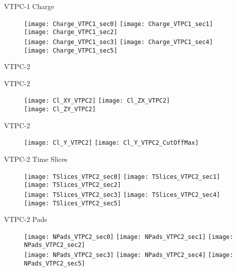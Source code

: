 \documentclass[11pt]{beamer}
\begin{document}
\begin{frame}{VTPC-1 Charge}
\begin{figure}
\centering
\texttt{[image: Charge\_VTPC1\_sec0]}
\texttt{[image: Charge\_VTPC1\_sec1]}
\texttt{[image: Charge\_VTPC1\_sec2]}\\
\texttt{[image: Charge\_VTPC1\_sec3]}
\texttt{[image: Charge\_VTPC1\_sec4]}
\texttt{[image: Charge\_VTPC1\_sec5]}
\end{figure}
\end{frame}

\begin{frame}
\centering
\Huge
VTPC-2
\end{frame}

\begin{frame}{VTPC-2}
\begin{figure}
\centering
\texttt{[image: Cl\_XY\_VTPC2]}
\texttt{[image: Cl\_ZX\_VTPC2]}\\
\texttt{[image: Cl\_ZY\_VTPC2]}
\end{figure}
\end{frame}

\begin{frame}{VTPC-2}
\begin{figure}
\centering
\texttt{[image: Cl\_Y\_VTPC2]}
\texttt{[image: Cl\_Y\_VTPC2\_CutOffMax]}
\end{figure}
\end{frame}

\begin{frame}{VTPC-2 Time Slices}
\begin{figure}
\centering
\texttt{[image: TSlices\_VTPC2\_sec0]}
\texttt{[image: TSlices\_VTPC2\_sec1]}
\texttt{[image: TSlices\_VTPC2\_sec2]}\\
\texttt{[image: TSlices\_VTPC2\_sec3]}
\texttt{[image: TSlices\_VTPC2\_sec4]}
\texttt{[image: TSlices\_VTPC2\_sec5]}
\end{figure}
\end{frame}

\begin{frame}{VTPC-2 Pads}
\begin{figure}
\centering
\texttt{[image: NPads\_VTPC2\_sec0]}
\texttt{[image: NPads\_VTPC2\_sec1]}
\texttt{[image: NPads\_VTPC2\_sec2]}\\
\texttt{[image: NPads\_VTPC2\_sec3]}
\texttt{[image: NPads\_VTPC2\_sec4]}
\texttt{[image: NPads\_VTPC2\_sec5]}
\end{figure}
\end{frame}
\end{document}
